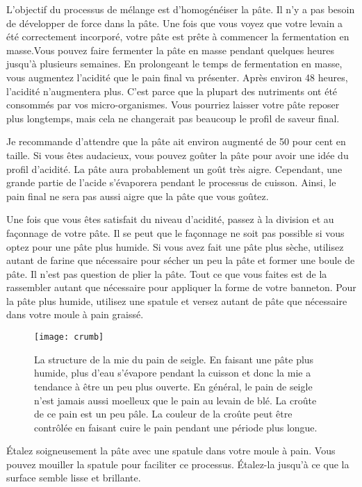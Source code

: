 L'objectif du processus de mélange est d'homogénéiser la pâte. Il n'y a pas besoin de développer de force dans la pâte. Une fois que vous voyez que
votre levain a été correctement incorporé, votre
pâte est prête à commencer la fermentation en masse.Vous pouvez faire fermenter la pâte en masse pendant quelques heures jusqu'à
plusieurs semaines. En prolongeant le temps de fermentation en masse, vous augmentez
l'acidité que le pain final va présenter. Après environ
48 heures, l'acidité n'augmentera plus. C'est parce que
la plupart des nutriments ont été consommés par vos micro-organismes.
Vous pourriez laisser votre pâte reposer plus longtemps, mais cela ne changerait pas beaucoup le
profil de saveur final.

Je recommande d'attendre que la pâte ait environ augmenté de 50 pour cent
en taille. Si vous êtes audacieux, vous pouvez goûter la pâte
pour avoir une idée du profil d'acidité. La pâte aura probablement
un goût très aigre. Cependant, une grande partie de l'acide s'évaporera
pendant le processus de cuisson. Ainsi, le pain final ne sera pas
aussi aigre que la pâte que vous goûtez.

Une fois que vous êtes satisfait du niveau d'acidité, passez à la division
et au façonnage de votre pâte. Il se peut que le façonnage ne soit pas possible si vous optez
pour une pâte plus humide. Si vous avez fait une pâte plus sèche, utilisez autant
de farine que nécessaire pour sécher un peu la pâte et former une boule de pâte.
Il n'est pas question de plier la pâte. Tout ce que vous faites est de la rassembler
autant que nécessaire pour appliquer la forme de votre banneton.
Pour la pâte plus humide, utilisez une spatule et versez autant de pâte que
nécessaire dans votre moule à pain graissé.

\begin{figure}[!htb]
  \texttt{[image: crumb]}
  \caption[Pain de seigle]{La structure de la mie du pain de seigle. En faisant une pâte plus
  humide, plus d'eau s'évapore pendant la cuisson et donc la
  mie a tendance à être un peu plus ouverte. En général, le
  pain de seigle n'est jamais aussi moelleux que le pain au levain de blé. La croûte
  de ce pain est un peu pâle. La couleur de la croûte peut être contrôlée
  en faisant cuire le pain pendant une période plus longue.}%
  \label{fig:rye-crumb}
\end{figure}

Étalez soigneusement la pâte avec une spatule dans votre moule à pain. Vous
pouvez mouiller la spatule pour faciliter ce processus. Étalez-la
jusqu'à ce que la surface semble lisse et brillante.

